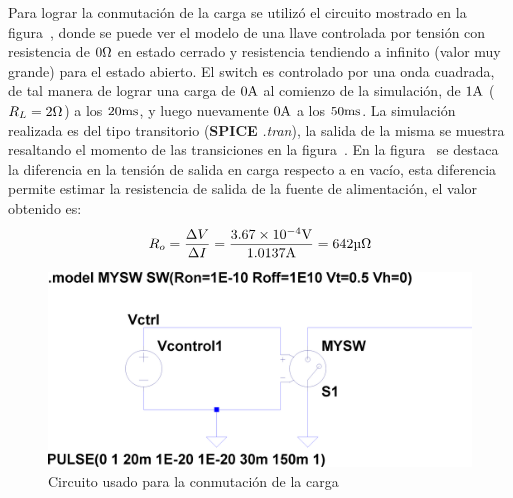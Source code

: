 
\vspace{1.5cm}


Para lograr la conmutación de la carga se utilizó el circuito mostrado en la figura~, donde se puede ver el modelo de una llave controlada por tensión con resistencia de $0 \si[per-mode=symbol]{\ohm}$ en estado cerrado y resistencia tendiendo a infinito (valor muy grande) para el estado abierto. El switch es controlado por una onda cuadrada, de tal manera de lograr una carga de $0 \si[per-mode=symbol]{\ampere}$ al comienzo de la simulación, de $1 \si[per-mode=symbol]{\ampere}$ ($R_{L} = 2 \si[per-mode=symbol]{\ohm}$) a los $20 \si[per-mode=symbol]{\milli\second}$, y luego nuevamente $0 \si[per-mode=symbol]{\ampere}$ a los $50 \si[per-mode=symbol]{\milli\second}$. La simulación realizada es del tipo transitorio (\textbf{SPICE} \textit{.tran}), la salida de la misma se muestra resaltando el momento de las transiciones en la figura~. En la figura~ se destaca la diferencia en la tensión de salida en carga respecto a en vacío, esta diferencia permite estimar la resistencia de salida de la fuente de alimentación, el valor obtenido es:\\


\begin{equation}
R_{o} = \frac{\Delta V}{\Delta I} = \frac{\num{3.67E-4} \si[per-mode=symbol]{\volt}}{1.0137 \si[per-mode=symbol]{\ampere}} = 642 \si[per-mode=symbol]{\micro\ohm}
\end{equation}

\begin{figure}[H] %
\begin{center}
\includegraphics[width=0.9 \textwidth, angle=0]{./img/preguntas/p16a.png}
\caption{\label{fig:fig_p16_rl_switch}\footnotesize{Circuito usado para la conmutación de la carga}}
\end{center}
\end{figure}


